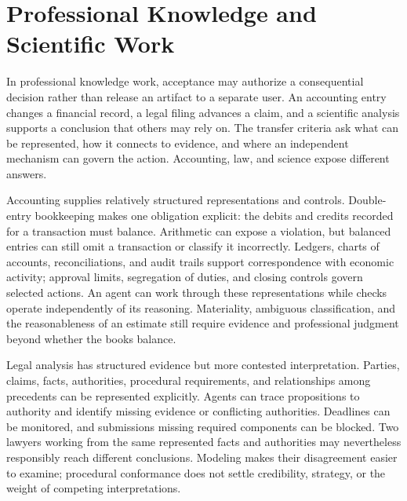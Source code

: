 \section{Professional Knowledge and Scientific Work}\label{heading:professional-knowledge-and-scientific-work}

In professional knowledge work, acceptance may authorize a consequential decision rather than release an artifact to a separate user. An accounting entry changes a financial record, a legal filing advances a claim, and a scientific analysis supports a conclusion that others may rely on. The transfer criteria ask what can be represented, how it connects to evidence, and where an independent mechanism can govern the action. Accounting, law, and science expose different answers.

Accounting supplies relatively structured representations and controls. Double-entry bookkeeping makes one obligation explicit: the debits and credits recorded for a transaction must balance. Arithmetic can expose a violation, but balanced entries can still omit a transaction or classify it incorrectly. Ledgers, charts of accounts, reconciliations, and audit trails support correspondence with economic activity; approval limits, segregation of duties, and closing controls govern selected actions. An agent can work through these representations while checks operate independently of its reasoning. Materiality, ambiguous classification, and the reasonableness of an estimate still require evidence and professional judgment beyond whether the books balance.

Legal analysis has structured evidence but more contested interpretation. Parties, claims, facts, authorities, procedural requirements, and relationships among precedents can be represented explicitly. Agents can trace propositions to authority and identify missing evidence or conflicting authorities. Deadlines can be monitored, and submissions missing required components can be blocked. Two lawyers working from the same represented facts and authorities may nevertheless responsibly reach different conclusions. Modeling makes their disagreement easier to examine; procedural conformance does not settle credibility, strategy, or the weight of competing interpretations.

